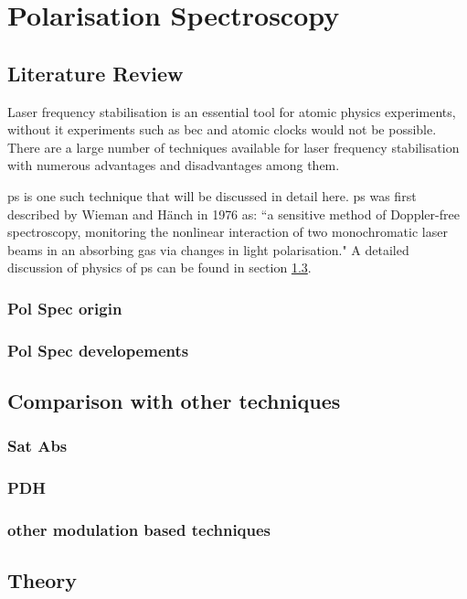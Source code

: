 \chapter{Polarisation Spectroscopy}

\section{Literature Review}

Laser frequency stabilisation is an essential tool for atomic physics experiments, without it experiments such as \gls{bec} and atomic clocks would not be possible.
There are a large number of techniques available for laser frequency stabilisation with numerous advantages and disadvantages among them.

\Gls{ps} is one such technique that will be discussed in detail here.
\Gls{ps} was first described by Wieman and H\"anch in 1976 as: ``a sensitive method of Doppler-free spectroscopy, monitoring the nonlinear interaction of two monochromatic laser beams in an absorbing gas via changes in light polarisation."\cite{wieman_doppler-free_1976}
A detailed discussion of physics of \gls{ps} can be found in section \ref{section:pol_spec_theory}.

\subsection{Pol Spec origin}
\subsection{Pol Spec developements}
\section{Comparison with other techniques}
\subsection{Sat Abs}
\subsection{PDH}
\subsection{other modulation based techniques}
\section{Theory}\label{section:pol_spec_theory}

